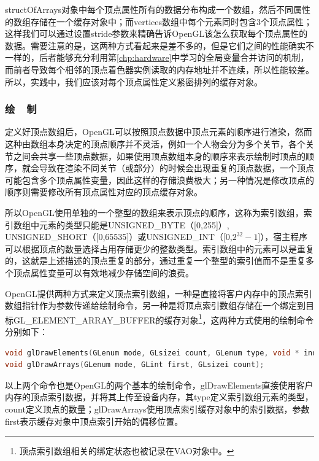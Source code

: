 structOfArrays对象中每个顶点属性所有的数据分布构成一个数组，然后不同属性的数组存储在一个缓存对象中；而vertices数组中每个元素同时包含3个顶点属性；这样我们可以通过设置stride参数来精确告诉OpenGL该怎么获取每个顶点属性的数据。需要注意的是，这两种方式看起来是差不多的，但是它们之间的性能确实不一样的，后者能够充分利用第\ref{chp:hardware}中学习的全局变量合并访问的机制，而前者导致每个相邻的顶点着色器实例读取的内存地址并不连续，所以性能较差。所以，实践中，我们应该对每个顶点属性定义紧密排列的缓存对象。






\subsubsection{绘~~制}
定义好顶点数组后，OpenGL可以按照顶点数据中顶点元素的顺序进行渲染，然而这种由数组本身决定的顶点顺序并不灵活，例如一个人物会分为多个关节，各个关节之间会共享一些顶点数据，如果使用顶点数组本身的顺序来表示绘制时顶点的顺序，就会导致在渲染不同关节（或部分）的时候会出现重复的顶点数据，一个顶点可能包含多个顶点属性变量，因此这样的存储浪费极大；另一种情况是修改顶点的顺序则需要修改所有顶点属性对应的顶点缓存对象。

所以OpenGL使用单独的一个整型的数组来表示顶点的顺序，这称为索引数组，索引数组中元素的类型只能是UNSIGNED\_BYTE（[0,255]）, UNSIGNED\_SHORT（[0,65535]）或UNSIGNED\_INT（[0,$2^{32}-1$]），宿主程序可以根据顶点的数量选择占用存储更少的整数类型。索引数组中的元素可以是重复的，这就是上述描述的顶点重复的部分，通过重复一个整型的索引值而不是重复多个顶点属性变量可以有效地减少存储空间的浪费。

OpenGL提供两种方式来定义顶点索引数组，一种是直接将客户内存中的顶点索引数组指针作为参数传递给绘制命令，另一种是将顶点索引数组存储在一个绑定到目标GL\_ELEMENT\_ARRAY\_BUFFER的缓存对象\footnote{顶点索引数组相关的绑定状态也被记录在VAO对象中。}，这两种方式使用的绘制命令分别如下：

\begin{lstlisting}[language=C++]
void glDrawElements​(GLenum mode​, GLsizei count​, GLenum type​, void * indices​);
void glDrawArrays​(GLenum mode​, GLint first​, GLsizei count​);
\end{lstlisting}

以上两个命令也是OpenGL的两个基本的绘制命令，glDrawElements直接使用客户内存的顶点索引数据，并将其上传至设备内存，其type定义索引数组元素的类型，count定义顶点的数量；glDrawArrays使用顶点索引缓存对象中的索引数据，参数first表示缓存对象中顶点索引开始的偏移位置。

